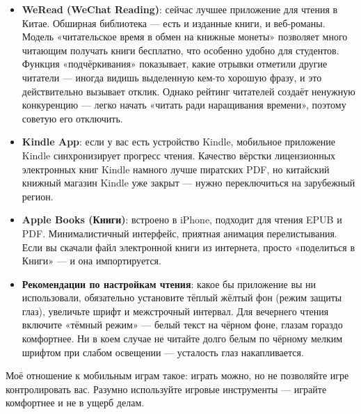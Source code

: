 \begin{itemize}
  \item \textbf{WeRead (WeChat Reading)}: сейчас лучшее приложение для чтения в Китае. Обширная библиотека — есть и изданные книги, и веб-романы. Модель «читательское время в обмен на книжные монеты» позволяет много читающим получать книги бесплатно, что особенно удобно для студентов. Функция «подчёркивания» показывает, какие отрывки отметили другие читатели — иногда видишь выделенную кем-то хорошую фразу, и это действительно вызывает отклик. Однако рейтинг читателей создаёт ненужную конкуренцию — легко начать «читать ради наращивания времени», поэтому советую его отключить.
  \item \textbf{Kindle App}: если у вас есть устройство Kindle, мобильное приложение Kindle синхронизирует прогресс чтения. Качество вёрстки лицензионных электронных книг Kindle намного лучше пиратских PDF, но китайский книжный магазин Kindle уже закрыт — нужно переключиться на зарубежный регион.
  \item \textbf{Apple Books (Книги)}: встроено в iPhone, подходит для чтения EPUB и PDF. Минималистичный интерфейс, приятная анимация перелистывания. Если вы скачали файл электронной книги из интернета, просто «поделиться в Книги» — и она импортируется.
  \item \textbf{Рекомендации по настройкам чтения}: какое бы приложение вы ни использовали, обязательно установите тёплый жёлтый фон (режим защиты глаз), увеличьте шрифт и межстрочный интервал. Для вечернего чтения включите «тёмный режим» — белый текст на чёрном фоне, глазам гораздо комфортнее. Ни в коем случае не читайте долго белым по чёрному мелким шрифтом при слабом освещении — усталость глаз накапливается.
\end{itemize}


Моё отношение к мобильным играм такое: играть можно, но не позволяйте игре контролировать вас. Разумно используйте игровые инструменты — играйте комфортнее и не в ущерб делам.

